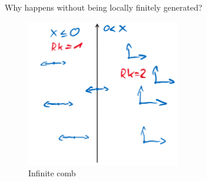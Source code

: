 \documentclass[hyperref={pdfpagelabels=false}]{beamer}
\theoremstyle{plain}
\theoremstyle{remark}
\begin{document}
{

\begin{frame}{Why happens without being locally finitely generated?}
\begin{figure}[htbp]
	\centering
		\includegraphics[width=0.6\textwidth]{Infinite comb.png}
	\caption{Infinite comb}
	\label{fig:Infinite comb}
\end{figure}

\end{frame}

}

%
\end{document}
